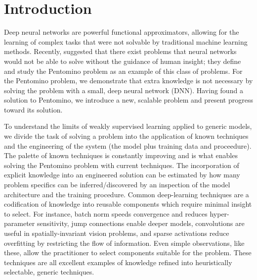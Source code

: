\section{Introduction}
Deep neural networks are powerful functional approximators, allowing for
the learning of complex tasks that were not solvable by traditional
machine learning methods. Recently, \cite{gulccehre2016knowledge}
suggested that there exist problems that neural networks would not be
able to solve without the guidance of human insight; they define and
study the Pentomino problem as an example of this class of problems. 
For the Pentomino problem, we demonstrate that extra
knowledge is not necessary by solving the problem with a small, deep neural network (DNN).
Having found a solution to Pentomino, we introduce a new, scalable problem and present progress toward its solution.

To understand the limits of weakly supervised learning applied to generic models, we divide the task of solving a problem into the application of known
techniques and the engineering of the system (the model plus training data and proceedure).  The palette of known
techniques is constantly improving and is what enables solving the
Pentomino problem with current techniques.  The incorporation of explicit
knowledge into an engineered solution can be estimated by how many problem
specifics can be inferred/discovered by an inspection of the model architecture and the training
procedure.  Common deep-learning techniques are a codification of
knowledge into reusable components which require minimal insight to
select.  For instance, batch norm \cite{ioffe2015batch} speeds
convergence and reduces hyper-parameter sensitivity, jump connections
\cite{srivastava2015training, he2016deep} enable deeper models,
convolutions \cite{lecun1998gradient,krizhevsky2012imagenet} are useful
in spatially-invariant vision problems, and sparse activations
\cite{srivastava2014dropout, wan2013regularization} reduce overfitting
by restricting the flow of information.  Even simple observations, like these,
allow the practitioner to select components suitable for the problem. 
These techniques are all excellent examples of knowledge refined into
heuristically selectable, generic techniques.

